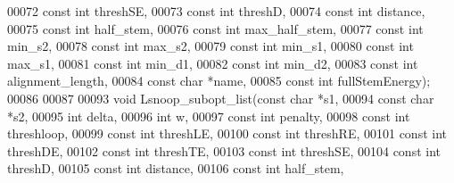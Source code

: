 \begin{DoxyCode}
00072                    \textcolor{keyword}{const} \textcolor{keywordtype}{int}  threshSE,
00073                    \textcolor{keyword}{const} \textcolor{keywordtype}{int}  threshD,
00074                    \textcolor{keyword}{const} \textcolor{keywordtype}{int}  distance,
00075                    \textcolor{keyword}{const} \textcolor{keywordtype}{int}  half\_stem,
00076                    \textcolor{keyword}{const} \textcolor{keywordtype}{int}  max\_half\_stem,
00077                    \textcolor{keyword}{const} \textcolor{keywordtype}{int}  min\_s2,
00078                    \textcolor{keyword}{const} \textcolor{keywordtype}{int}  max\_s2,
00079                    \textcolor{keyword}{const} \textcolor{keywordtype}{int}  min\_s1,
00080                    \textcolor{keyword}{const} \textcolor{keywordtype}{int}  max\_s1,
00081                    \textcolor{keyword}{const} \textcolor{keywordtype}{int}  min\_d1,
00082                    \textcolor{keyword}{const} \textcolor{keywordtype}{int}  min\_d2,
00083                    \textcolor{keyword}{const} \textcolor{keywordtype}{int}  alignment\_length,
00084                    \textcolor{keyword}{const} \textcolor{keywordtype}{char} *name,
00085                    \textcolor{keyword}{const} \textcolor{keywordtype}{int}  fullStemEnergy);
00086 
00087 
00093 \textcolor{keywordtype}{void} Lsnoop\_subopt\_list(\textcolor{keyword}{const} \textcolor{keywordtype}{char}  *s1,
00094                         \textcolor{keyword}{const} \textcolor{keywordtype}{char}  *s2,
00095                         \textcolor{keywordtype}{int}         delta,
00096                         \textcolor{keywordtype}{int}         w,
00097                         \textcolor{keyword}{const} \textcolor{keywordtype}{int}   penalty,
00098                         \textcolor{keyword}{const} \textcolor{keywordtype}{int}   threshloop,
00099                         \textcolor{keyword}{const} \textcolor{keywordtype}{int}   threshLE,
00100                         \textcolor{keyword}{const} \textcolor{keywordtype}{int}   threshRE,
00101                         \textcolor{keyword}{const} \textcolor{keywordtype}{int}   threshDE,
00102                         \textcolor{keyword}{const} \textcolor{keywordtype}{int}   threshTE,
00103                         \textcolor{keyword}{const} \textcolor{keywordtype}{int}   threshSE,
00104                         \textcolor{keyword}{const} \textcolor{keywordtype}{int}   threshD,
00105                         \textcolor{keyword}{const} \textcolor{keywordtype}{int}   distance,
00106                         \textcolor{keyword}{const} \textcolor{keywordtype}{int}   half\_stem,

\end{DoxyCode}
